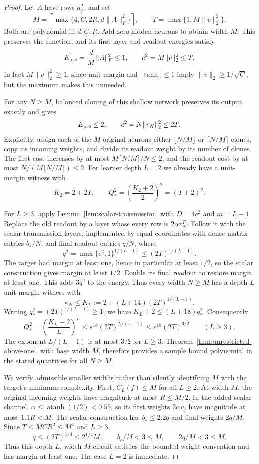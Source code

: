 \begin{proof}
Let $A$ have rows $a_j^T$, and set
\[
 M=\left\lceil\max\{4,C,2R,d\|A\|_F^2\}\right\rceil,
 \qquad T=\max\{1,M\|v\|_2^2\}.
\]
Both are polynomial in $d,C,R$. Add zero hidden neurons to obtain width
$M$. This preserves the function, and its first-layer and readout
energies satisfy
\[
 E_{\rm pre}=\frac dM\|A\|_F^2\le1,
 \qquad c^2=M\|v\|_2^2\le T.
\]
In fact $M\|v\|_2^2\ge1$, since unit margin and $|\tanh|\le1$ imply
$\|v\|_2\ge1/\sqrt C$, but the maximum makes this unneeded.

For any $N\ge M$, balanced cloning of this shallow network preserves its
output exactly and gives
\[
 E_{\rm pre}\le2,\qquad c^2=N\|v_N\|_2^2\le2T.
\]
Explicitly, assign each of the $M$ original neurons either
$\lfloor N/M\rfloor$ or $\lceil N/M\rceil$ clones, copy its incoming
weights, and divide its readout weight by its number of clones.
The first cost increases by at most $M\lceil N/M\rceil/N\le2$,
and the readout cost by at most $N/(M\lfloor N/M\rfloor)\le2$.
For learner depth $L=2$ we already have a unit-margin witness with
\[
 K_2=2+2T,\qquad
 Q_*^2=\left(\frac{K_2+2}{2}\right)^2=(T+2)^2.
\]

For $L\ge3$, apply Lemma~\ref{lem:scalar-transmission} with
$D=4c^2$ and $m=L-1$. Replace the old readout by a layer whose every
row is $2\alpha v_N^T$. Follow it with the scalar transmission layers,
implemented by equal coordinates with dense matrix entries $b_s/N$,
and final readout entries $q/N$, where
\[
 q^2=\max\{c^2,1\}^{1/(L-1)}\le(2T)^{1/(L-1)}.
\]
The target had margin at least one, hence in particular at least
$1/2$, so the scalar construction gives margin at least $1/2$.
Double its final readout to restore margin at least one. This adds
$3q^2$ to the energy. Thus every width $N\ge M$ has a depth-$L$
unit-margin witness with
\[
 \kappa_N\le K_L:=2+(L+14)(2T)^{1/(L-1)}.
\]
Writing $q_*^2=(2T)^{1/(L-1)}\ge1$, we have
$K_L+2\le(L+18)q_*^2$. Consequently
\begin{equation}\label{eq:shallow-product-polynomial}
 Q_*^2=\left(\frac{K_L+2}{L}\right)^L
 \le e^{18}(2T)^{L/(L-1)}
 \le e^{18}(2T)^{3/2}\qquad(L\ge3).
\end{equation}
The exponent $L/(L-1)$ is at most $3/2$ for $L\ge3$.
Theorem~\ref{thm:unrestricted-above-one}, with base width $M$, therefore
provides a sample bound polynomial in the stated quantities for all
$N\ge M$.

We verify admissible smaller widths rather than silently identifying
$M$ with the target's minimum complexity. First, $C_L(f)\le M$ for all
$L\ge2$. At width $M$, the original incoming weights have magnitude
at most $R\le M/2$. In the added scalar channel,
$\alpha\le\operatorname{atanh}(1/2)<0.55$, so its first weights
$2\alpha v_j$ have magnitude at most $1.1R<M$.
The scalar construction has $b_s\le2.2q$ and final weights $2q/M$.
Since $T\le MC R^2\le M^4$ and $L\ge3$,
\[
 q\le(2T)^{1/4}\le2^{1/4}M,
 \qquad b_s/M<3\le M,\qquad 2q/M<3\le M.
\]
Thus this depth-$L$, width-$M$ circuit satisfies the bounded-weight
convention and has margin at least one. The case $L=2$ is immediate.


\end{proof}
